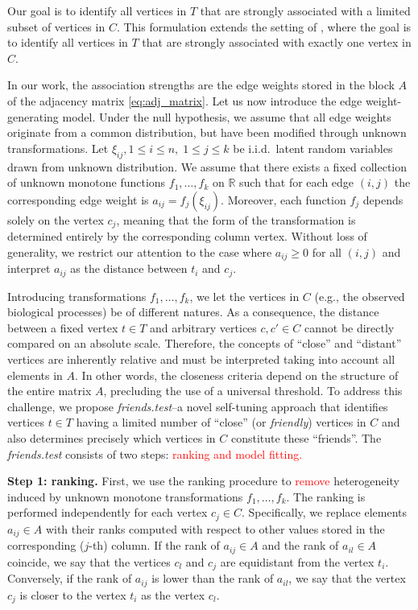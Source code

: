 \documentclass{llncs}
\begin{document}
Our goal is to identify all vertices in $T$ that are strongly associated with a limited subset of vertices in $C$. This formulation extends the setting of \cite{stein-obrien_patternmarkers_2017}, where the goal is to identify all vertices in $T$ that are strongly associated with exactly one vertex in $C$. 

In our work, the association strengths are the edge weights stored in the block $A$ of the adjacency matrix \eqref{eq:adj_matrix}. Let us now introduce the edge weight-generating model.
Under the null hypothesis, we assume that all edge weights originate from a common distribution, but have been modified through unknown transformations. Let $\xi_{ij}, 1 \le i \le n,\; 1 \le j \le k$ be i.i.d.\ latent random variables drawn from unknown distribution. We assume that there exists a fixed collection of unknown monotone functions $f_1, \dots, f_k$ on $\mathbb{R}$
such that for each edge $(i,j)$ the corresponding edge weight is $a_{ij} = f_j(\xi_{ij})$.
Moreover, each function 
$f_j$ depends solely on the vertex $c_j$, meaning that the form of the transformation is determined entirely by the corresponding column vertex. Without loss of generality, we restrict our attention to the case where 
$a_{ij}\ge 0$ for all $(i,j)$ and interpret $a_{ij}$
as the distance between $t_i$ and $c_j$.

Introducing transformations $f_1, \dots, f_k$, we let the vertices in $C$ (e.g., the observed biological processes) be of different natures. As a consequence, the distance between a fixed vertex $t\in T$ and arbitrary vertices $c, c' \in C$ cannot be directly compared on an absolute scale. Therefore, the concepts of ``close'' and ``distant'' vertices are inherently relative and must be interpreted taking into account all elements in $A$. In other words, the closeness criteria depend on the structure of the entire matrix $A$, precluding the use of a universal threshold. To address this challenge, we propose \textit{friends.test}--a novel self-tuning approach that identifies vertices $t\in T$ having a limited number of ``close'' (or \textit{friendly}) vertices in $C$ and also determines precisely which vertices in $C$ constitute these ``friends''. The \textit{friends.test} consists of two steps: \textcolor{red}{ranking and model fitting.}

\textbf{Step 1: ranking.} First, we use the ranking procedure to  \textcolor{red}{remove} heterogeneity induced by unknown monotone transformations $f_1, \dots, f_k$. The ranking is performed independently for each vertex $c_j \in C$. Specifically, we replace elements $a_{ij} \in A$ with their ranks computed with respect to other values stored in the corresponding ($j$-th) column. If the rank of $a_{ij} \in A$ and the rank of $a_{il}\in A$ coincide, we say that the vertices $c_l$ and $c_j$ are equidistant from the vertex $t_i$. Conversely, if the rank of $a_{ij}$ is lower than the rank of $a_{il}$, we say that the vertex $c_j$ is closer to the vertex $t_i$ as the vertex $c_l$.
\end{document}

